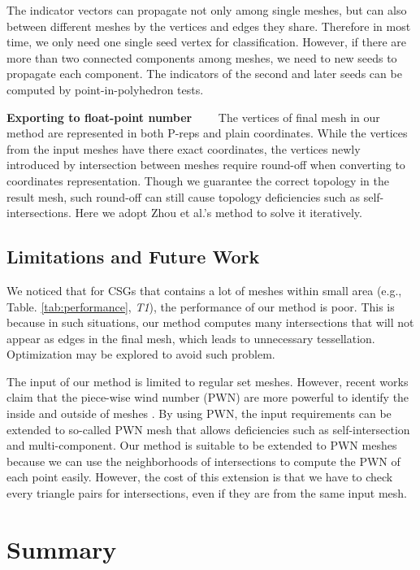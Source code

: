 \documentclass[10pt,journal,compsoc]{IEEEtran}
\begin{document}
\vspace{0.5em} The indicator vectors can propagate not only among single meshes, but can also between different meshes by the vertices and edges they share. Therefore in most time, we only need one single seed vertex for classification. However, if there are more than two connected components among meshes, we need to new seeds to propagate each component. The indicators of the second and later seeds can be computed by point-in-polyhedron tests.

\vspace{0.5em}
\noindent\textbf{Exporting to float-point number}~~~~
The vertices of final mesh in our method are represented in both P-reps and plain coordinates. While the vertices from the input meshes have there exact coordinates, the vertices newly introduced by intersection between meshes require round-off when converting to coordinates representation. Though we guarantee the correct topology in the result mesh, such round-off can still cause topology deficiencies such as self-intersections. Here we adopt Zhou et al.'s method \cite{zhou2016mesh} to solve it iteratively.

\subsection{Limitations and Future Work}

We noticed that for CSGs that contains a lot of meshes within small area (e.g., Table. \ref{tab:performance}, \emph{T1}), the performance of our method is poor. This is because in such situations, our method computes many intersections that will not appear as edges in the final mesh, which leads to unnecessary tessellation. Optimization may be explored to avoid such problem.

The input of our method is limited to regular set meshes. However, recent works claim that the piece-wise wind number (PWN) are more powerful to identify the inside and outside of meshes \cite{zhou2016mesh}.  By using PWN, the input requirements can be extended to so-called PWN mesh that allows deficiencies such as self-intersection and multi-component. Our method is suitable to be extended to PWN meshes because we can use the neighborhoods of intersections to compute the PWN of each point easily. However, the cost of this extension is that we have to check every triangle pairs for intersections, even if they are from the same input mesh.


\section{Summary}
\end{document}

